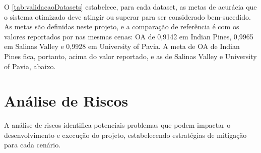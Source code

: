 O \autoref{tab:validacaoDatasets} estabelece, para cada dataset, as metas de acurácia que o sistema otimizado deve atingir ou superar para ser considerado bem-sucedido. As metas são definidas neste projeto, e a comparação de referência é com os valores reportados por  nas mesmas cenas: OA de 0,9142 em Indian Pines, 0,9965 em Salinas Valley e 0,9928 em University of Pavia. A meta de OA de Indian Pines fica, portanto, acima do valor reportado, e as de Salinas Valley e University of Pavia, abaixo.


\begin{quadro}[H]
    \centering
    \caption{Validação de desempenho nos datasets de referência}
    \label{tab:validacaoDatasets}
\end{quadro}

\section{Análise de Riscos} 
\label{sec:analiseRiscos}

A análise de riscos identifica potenciais problemas que podem impactar o desenvolvimento e execução do projeto, estabelecendo estratégias de mitigação para cada cenário.

